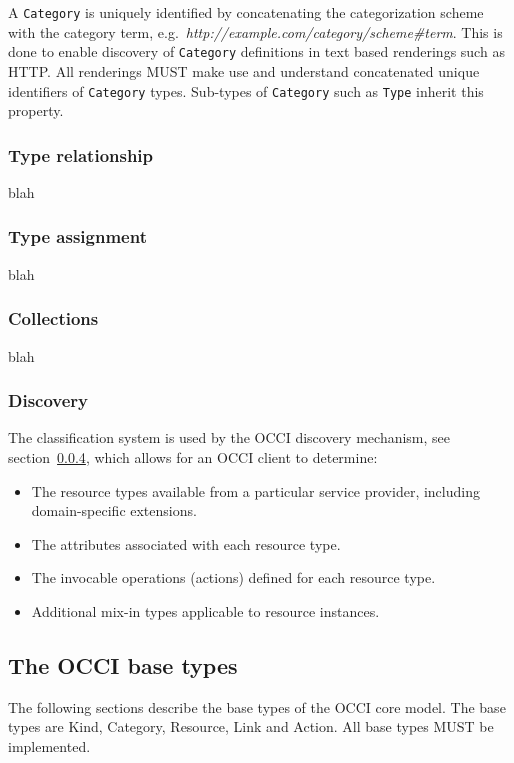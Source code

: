 \documentclass[10pt,a4paper,british]{article}
\newcommand{\hl}{\texttt}
\begin{document}
A \hl{Category} is uniquely identified by concatenating the categorization
scheme with the category term,
e.g.~\textit{http://example.com/category/scheme\#term}.
This is done to enable discovery of \hl{Category} definitions in text based
renderings such as HTTP. All renderings MUST make use and understand
concatenated unique identifiers of \hl{Category} types.
%
Sub-types of \hl{Category} such as \hl{Type} inherit this property.


\subsubsection{Type relationship}
\label{sec:type_relationship}
blah

\subsubsection{Type assignment}
blah

\subsubsection{Collections}
blah

\subsubsection{Discovery}
\label{sec:discovery}
The classification system is used by the OCCI discovery mechanism, see
section~\ref{sec:discovery}, which allows for an OCCI client to determine:
\begin{itemize}
\item The resource types available from a particular service provider, including domain-specific extensions.
\item The attributes associated with each resource type.
\item The invocable operations (actions) defined for each resource type.
\item Additional mix-in types applicable to resource instances.
\end{itemize}

\subsection{The OCCI base types}
\label{sec:base_types}
The following sections describe the base types of the OCCI core
model. The base types are Kind, Category, Resource, Link and
Action. All base types MUST be implemented.
\end{document}
